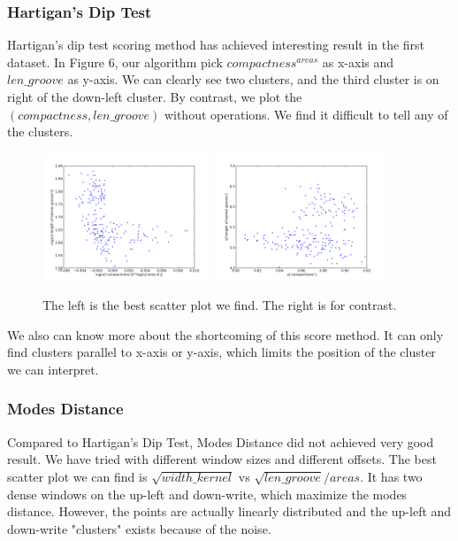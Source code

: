 \documentclass[fleqn]{SelfArx} %
\begin{document}
\subsubsection{Hartigan's Dip Test}

Hartigan's dip test scoring method has achieved interesting result in the first dataset. In Figure 6, our algorithm pick $compactness^{areas}$ as x-axis and $len\_groove$ as y-axis. We can clearly see two clusters, and the third cluster is on right of the down-left cluster. By contrast, we plot the $(compactness, len\_groove)$ without operations. We find it difficult to tell any of the clusters.\\

\begin{center}
\begin{figure}[h]
  \includegraphics[width=0.45\textwidth]{Seed}
  \includegraphics[width=0.45\textwidth]{seed_before}
  \caption{The left is the best scatter plot we find. The right is for contrast.}
\end{figure}
\end{center}

We also can know more about the shortcoming of this score method. It can only find clusters parallel to x-axis or y-axis, which limits the position of the cluster we can interpret.

\subsubsection{Modes Distance}
Compared to Hartigan's Dip Test, Modes Distance did not achieved very good result. We have tried with different window sizes and different offsets. The best scatter plot we can find is $\sqrt{width\_kernel}$ vs $\sqrt{len\_groove}/{areas}$. It has two dense windows on the up-left and down-write, which maximize the modes distance. However, the points are actually linearly distributed and the up-left and down-write "clusters" exists because of the noise.
\end{document}
